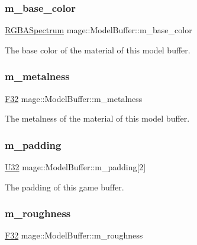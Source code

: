 \subsubsection{\texorpdfstring{m\+\_\+base\+\_\+color}{m\_base\_color}}
{\footnotesize\ttfamily \hyperlink{structmage_1_1_r_g_b_a_spectrum}{R\+G\+B\+A\+Spectrum} mage\+::\+Model\+Buffer\+::m\+\_\+base\+\_\+color}

The base color of the material of this model buffer. \hypertarget{structmage_1_1_model_buffer_a1be491fffd79c3e5d37d066f0ef9ab96}{}\label{structmage_1_1_model_buffer_a1be491fffd79c3e5d37d066f0ef9ab96} 
\subsubsection{\texorpdfstring{m\+\_\+metalness}{m\_metalness}}
{\footnotesize\ttfamily \hyperlink{namespacemage_aa97e833b45f06d60a0a9c4fc22ae02c0}{F32} mage\+::\+Model\+Buffer\+::m\+\_\+metalness}

The metalness of the material of this model buffer. \hypertarget{structmage_1_1_model_buffer_a11ae104f8ba32afbd910a2f18d04d352}{}\label{structmage_1_1_model_buffer_a11ae104f8ba32afbd910a2f18d04d352} 
\subsubsection{\texorpdfstring{m\+\_\+padding}{m\_padding}}
{\footnotesize\ttfamily \hyperlink{namespacemage_a41c104c036fba3756a74e19f793eeaa1}{U32} mage\+::\+Model\+Buffer\+::m\+\_\+padding\mbox{[}2\mbox{]}}

The padding of this game buffer. \hypertarget{structmage_1_1_model_buffer_a33adb9ff193fcccf618bf6ceb7b1a31e}{}\label{structmage_1_1_model_buffer_a33adb9ff193fcccf618bf6ceb7b1a31e} 
\subsubsection{\texorpdfstring{m\+\_\+roughness}{m\_roughness}}
{\footnotesize\ttfamily \hyperlink{namespacemage_aa97e833b45f06d60a0a9c4fc22ae02c0}{F32} mage\+::\+Model\+Buffer\+::m\+\_\+roughness}

